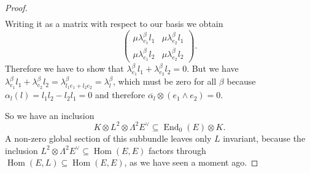 \documentclass[A4paper, 12pt, british, reqno]{amsart}
\DeclareMathOperator{\Hom}{Hom}
\DeclareMathOperator{\End}{End}
\newcommand{\ot}{\otimes}
\newcommand{\dual}{^{\vee}}
\begin{document}
\begin{lm}
\begin{proof}
\begin{align*}
	\end{align*}
	Writing it as a matrix with respect to our basis we obtain
	\[
	    \begin{pmatrix}
		\mu\lambda_{e_{1}}^{\beta}l_{1} & \mu\lambda_{e_{2}}^{\beta}l_{1} \\
		\mu\lambda_{e_{1}}^{\beta}l_{2} & \mu\lambda_{e_{2}}^{\beta}l_{2}
	    \end{pmatrix}.
	\]
	Therefore we have to show that $\lambda_{e_{1}}^{\beta}l_{1}+\lambda_{e_{2}}^{\beta}l_{2}=0$.
	But we have $\lambda_{e_{1}}^{\beta}l_{1}+\lambda_{e_{2}}^{\beta}l_{2}=\lambda_{l_{1}e_{1}+l_{2}e_{2}}^{\beta}=\lambda_{l}^{\beta}$, which must be zero for all $\beta$ because $\alpha_{l}(l)=l_{1}l_{2}-l_{2}l_{1}=0$ and therefore $\overline{\alpha_{l}}\ot (e_{1}\wedge e_{2})=0$.

	So we have an inclusion
	\[ K\ot L^{2}\ot \Lambda^{2}E\dual \subseteq \End_{0}(E)\ot K. \]
	A non-zero global section of this subbundle leaves only $L$ invariant, because the inclusion $L^{2}\ot \Lambda^{2}E\dual \subseteq \Hom(E,E)$ factors through $\Hom(E,L)\subseteq \Hom(E,E)$, as we have seen a moment ago.
    \end{proof}
\end{lm}



\vfill
\end{document}
